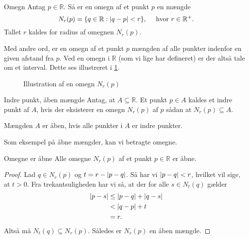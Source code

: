 \begin{definition}[label=def:omegn]{Omegn}{}
  Antag $p \in \mathbb{R}$. 
  Så er en omegn af et punkt $p$ en mængde 
  \[
  N_r(p)=\{ q \in \mathbb{R}:\abs{q-p} < r \}, \quad \text{ hvor }r \in \mathbb{R}^+. 
  \] 
  Tallet $r$ kaldes for radius af omegnen $N_r(p)$. 
\end{definition}
Med andre ord, er en omegn af et punkt $p$ mængden af alle punkter indenfor en given afstand fra $p$.
Ved en omegn i $\mathbb{R}$ (som vi lige har defineret) er der altså tale om et interval. 
Dette ses illustreret i \cref{fig:omegn}.
\begin{figure}[H]
\begin{center}
\end{center}
  \caption{Illustration af en omegn $N_r(p)$}
\label{fig:omegn}
\end{figure}

\begin{definition}[label=def:åben]{Indre punkt, åben mængde }{}
  Antag, at $A \subseteq \mathbb{R}$. 
  Et punkt $p \in A$ kaldes et indre punkt af $A$, hvis der eksisterer en omegn $N_r(p)$ af $p$ sådan at $N_r(p) \subseteq A$. 

  Mængden $A$ er åben, hvis alle punkter i $A$ er indre punkter. 
\end{definition}

Som eksempel på åbne mængder, kan vi betragte omegne.

\begin{theorem}[label=theo:omegne_åbne]{Omegne er åbne}{}
  Alle omegne $N_r(p)$ af et punkt $p \in \mathbb{R}$ er åbne. 
\end{theorem}
\begin{proof} 
  Lad $q \in N_r(p)$ og $t=r-\abs{p-q} $.
  Så har vi $\abs{p-q} <r$, hvilket vil sige, at $t>0$.
  Fra trekantsuligheden har vi så, at der for alle $s \in N_t(q)$ gælder
  \begin{equation*}
  \begin{split}
    \abs{p-s} &\leq \abs{p-q} + \abs{q-s} \\
    &<\abs{q-p} + t \\
    &=r.
  \end{split}
  \end{equation*}
  Altså må $N_t(q)\subseteq N_r(p)$.
  Således er $N_r(p)$ en åben mængde.
\end{proof}

